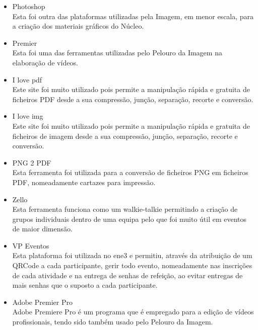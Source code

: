 \begin{itemize}
\item Photoshop\\
Esta foi outra das plataformas utilizadas pela Imagem, em menor escala, para a criação dos materiais gráficos do Núcleo.

\item Premier\\
Esta foi uma das ferramentas utilizadas pelo Pelouro da Imagem na elaboração de vídeos.

\item I love pdf\\
Este site foi muito utilizado pois permite a manipulação rápida e gratuita de ficheiros PDF desde a sua compressão, junção, separação, recorte e conversão.

\item I love img\\
Este site foi muito utilizado pois permite a manipulação rápida e gratuita de ficheiros de imagem desde a sua compressão, junção, separação, recorte e conversão.

\item PNG 2 PDF\\
Esta ferramenta foi utilizada para a conversão de ficheiros PNG em ficheiros PDF, nomeadamente cartazes para impressão.

\item Zello\\
Esta ferramenta funciona como um walkie-talkie permitindo a criação de grupos individuais dentro de uma equipa pelo que foi muito útil em eventos de maior dimensão.

\item VP Eventos\\
Esta plataforma foi utilizada no \acrshort{ene3} e permitiu, através da atribuição de um QRCode a cada participante, gerir todo evento, nomeadamente nas inscrições de cada atividade e na entrega de senhas de refeição, ao evitar entregas de mais senhas que o suposto a cada participante.

\item Adobe Premier Pro\\
Adobe Premiere Pro é um programa que é empregado para a edição de vídeos profissionais, tendo sido também usado pelo Pelouro da Imagem.

\end{itemize}